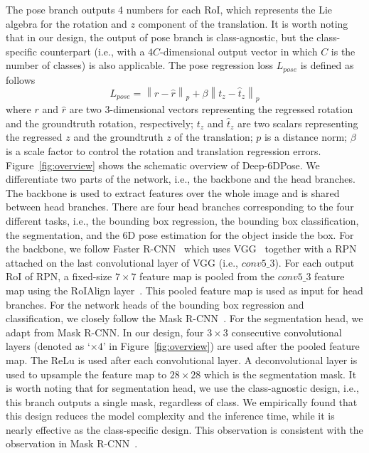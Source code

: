 \documentclass[conference]{IEEEtran}
\newcommand\red[1]{{\color{black}#1}}
\newcommand{\iancomment}[1]{\red{IAN: #1}}
\newcommand{\method}[1]{Deep-6DPose}
\newcommand\norm[1]{\left\lVert#1\right\rVert}
\begin{document}
The pose branch outputs 4 numbers for each RoI, which represents the Lie algebra for the rotation and $z$ component of the translation. It is worth noting that in our design, the output of pose branch is class-agnostic, %
but the class-specific counterpart (i.e., with a $4C$-dimensional output vector in which $C$ is the number of classes) is also applicable. 
The pose regression loss $L_{pose}$ is defined as follows
\begin{equation}
L_{pose} = \norm{r-\hat{r}}_p + \beta\norm{t_z - \hat{t}_z}_p
\label{eq:poseloss}
\end{equation}
where $r$ and $\hat{r}$ are two 3-dimensional vectors representing the regressed rotation and the groundtruth rotation, respectively; $t_z$ and $\hat{t}_z$ are two scalars representing the regressed $z$ and the groundtruth $z$ of the translation; $p$ is a distance norm; $\beta$ is a scale factor to control the rotation and translation regression errors. %
Figure~\ref{fig:overview} shows the schematic overview of \method{}. We differentiate two parts of the network, i.e., the backbone and the head branches. The backbone is used to extract features over the whole image and is shared between head branches. There are four head branches corresponding to the four different tasks, i.e., the bounding box regression, the bounding box classification, the segmentation, and the 6D pose estimation for the object inside the box. 
For the backbone, we follow Faster R-CNN~\cite{Faster-RCNN} which uses VGG~\cite{SimonyanZ14} together with a RPN attached on the last convolutional layer of VGG (i.e., $conv5\_3$). For each output RoI of RPN, a fixed-size $7\times7$ feature map is pooled from the $conv5\_3$ feature map using the RoIAlign layer~\cite{Mask-RCNN}. This pooled feature map is used as input for head branches. For the network heads of the bounding box regression and classification, we closely follow the Mask R-CNN~\cite{Mask-RCNN}. 
For the segmentation head, we adapt from Mask R-CNN. In our design, four $3\times3$ consecutive convolutional layers (denoted as `$\times4$' in Figure~\ref{fig:overview}) are used after the pooled feature map. The ReLu is used after each convolutional layer. A deconvolutional layer is used to upsample the feature map to $28\times28$ which is the segmentation mask. It is worth noting that for segmentation head, we use the class-agnostic design, i.e., this branch outputs a single mask, regardless of class. We empirically found that this design reduces the model complexity and the inference time, while it is nearly effective as the class-specific design. This observation is consistent with the observation in Mask R-CNN~\cite{Mask-RCNN}. 
\end{document}
